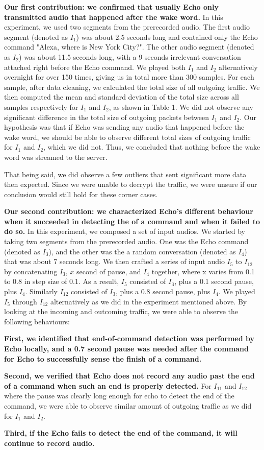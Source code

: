 \textbf{Our first contribution: we confirmed that usually Echo only transmitted audio that happened after the wake word.} In this experiment, we used two segments from the prerecorded audio. The first audio segment (denoted as $I_1$) was about 2.5 seconds long and contained only the Echo command "Alexa, where is New York City?". The other audio segment (denoted as $I_2$) was about 11.5 seconds long, with a 9 seconds irrelevant conversation attached right before the Echo command. We played both $I_1$ and $I_2$ alternatively overnight for over 150 times, giving us in total more than 300 samples. For each sample, after data cleaning, we calculated the total size of all outgoing traffic. We then computed the mean and standard deviation of the total size across all samples respectively for $I_1$ and $I_2$, as shown in Table 1. We did not observe any significant difference in the total size of outgoing packets between $I_1$ and $I_2$. Our hypothesis was that if Echo was sending any audio that happened before the wake word, we should be able to observe different total sizes of outgoing traffic for $I_1$ and $I_2$, which we did not. Thus, we concluded that nothing before the wake word was streamed to the server.

That being said, we did observe a few outliers that sent significant more data then expected. Since we were unable to decrypt the traffic, we were unsure if our conclusion would still hold for these corner cases.

\textbf{Our second contribution: we characterized Echo's different behaviour when it succeeded in detecting the of a command and when it failed to do so.} In this experiment, we composed a set of input audios. We started by taking two segments from the prerecorded audio. One was the Echo command (denoted as $I_3$), and the other was the a random conversation (denoted as $I_4$) that was about 7 seconds long. We then crafted a series of input audio $I_5$ to $I_{12}$ by concatenating $I_3$, $x$ second of pause, and $I_4$ together, where x varies from 0.1 to 0.8 in step size of 0.1. As a result, $I_5$ consisted of $I_3$, plus a 0.1 second pause, plus $I_4$. Similarly $I_{12}$ consisted of $I_3$, plus a 0.8 second pause, plus $I_4$. We played $I_5$ through $I_{12}$ alternatively as we did in the experiment mentioned above. By looking at the incoming and outcoming traffic, we were able to observe the following behaviours: 

\textbf{First, we identified that end-of-command detection was performed by Echo locally, and a 0.7 second pause was needed after the command for Echo to successfully sense the finish of a command.}  

\textbf{Second, we verified that Echo does not record any audio past the end of a command when such an end is properly detected.} For $I_{11}$ and $I_{12}$ where the pause was clearly long enough for echo to detect the end of the command, we were able to observe similar amount of outgoing traffic as we did for $I_{1}$ and $I_{2}$.

\textbf{Third, if the Echo fails to detect the end of the command, it will continue to record audio.}
